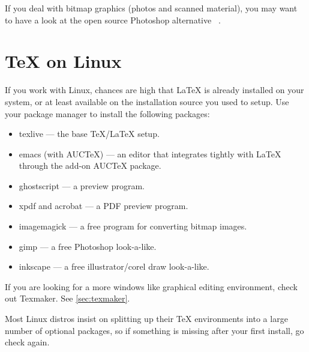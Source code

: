 If you deal with bitmap graphics (photos and scanned material), you may want
to have a look at the open source Photoshop alternative ~\cite{gimp}.

\section{\TeX{} on Linux}

If you work with Linux, chances are high that \LaTeX{} is already installed
on your system, or at least available on the installation source you used to
setup. Use your package manager to install the following packages:

\begin{itemize}
  \item texlive --- the base \TeX{}/\LaTeX{} setup.
  \item emacs (with AUCTeX) --- an editor that integrates tightly with \LaTeX{} through the add-on AUCTeX package.
  \item ghostscript --- a \PSi{} preview program.
  \item xpdf and acrobat --- a PDF preview program.
  \item imagemagick --- a free program for converting bitmap images.
  \item gimp --- a free Photoshop look-a-like.
  \item inkscape --- a free illustrator/corel draw look-a-like.
\end{itemize}

If you are looking for a more windows like graphical editing environment,
check out Texmaker. See \autoref{sec:texmaker}.

Most Linux distros insist on splitting up their \TeX{} environments into a
large number of optional packages, so if something is missing after your
first install, go check again.
